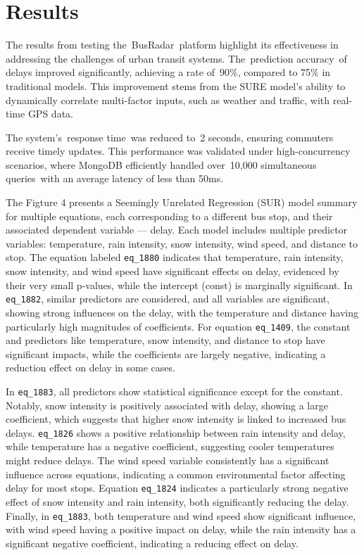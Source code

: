 \documentclass[conference]{IEEEtran}
\begin{document}
\section{Results}
The results from testing the BusRadar platform highlight its effectiveness in addressing the challenges of urban transit systems. The prediction accuracy of delays improved significantly, achieving a rate of 90\%, compared to 75\% in traditional models. This improvement stems from the SURE model's ability to dynamically correlate multi-factor inputs, such as weather and traffic, with real-time GPS data. 

The system's response time was reduced to 2 seconds, ensuring commuters receive timely updates. This performance was validated under high-concurrency scenarios, where MongoDB efficiently handled over 10,000 simultaneous queries with an average latency of less than 50ms.

The Figture 4 presents a Seemingly Unrelated Regression (SUR) model summary for multiple equations, each corresponding to a different bus stop, and their associated dependent variable --- delay. Each model includes multiple predictor variables: temperature, rain intensity, snow intensity, wind speed, and distance to stop. The equation labeled \texttt{eq\_1880} indicates that temperature, rain intensity, snow intensity, and wind speed have significant effects on delay, evidenced by their very small p-values, while the intercept (const) is marginally significant. In \texttt{eq\_1882}, similar predictors are considered, and all variables are significant, showing strong influences on the delay, with the temperature and distance having particularly high magnitudes of coefficients. For equation \texttt{eq\_1409}, the constant and predictors like temperature, snow intensity, and distance to stop have significant impacts, while the coefficients are largely negative, indicating a reduction effect on delay in some cases.

In \texttt{eq\_1883}, all predictors show statistical significance except for the constant. Notably, snow intensity is positively associated with delay, showing a large coefficient, which suggests that higher snow intensity is linked to increased bus delays. \texttt{eq\_1826} shows a positive relationship between rain intensity and delay, while temperature has a negative coefficient, suggesting cooler temperatures might reduce delays. The wind speed variable consistently has a significant influence across equations, indicating a common environmental factor affecting delay for most stops. Equation \texttt{eq\_1824} indicates a particularly strong negative effect of snow intensity and rain intensity, both significantly reducing the delay. Finally, in \texttt{eq\_1883}, both temperature and wind speed show significant influence, with wind speed having a positive impact on delay, while the rain intensity has a significant negative coefficient, indicating a reducing effect on delay.
\end{document}
